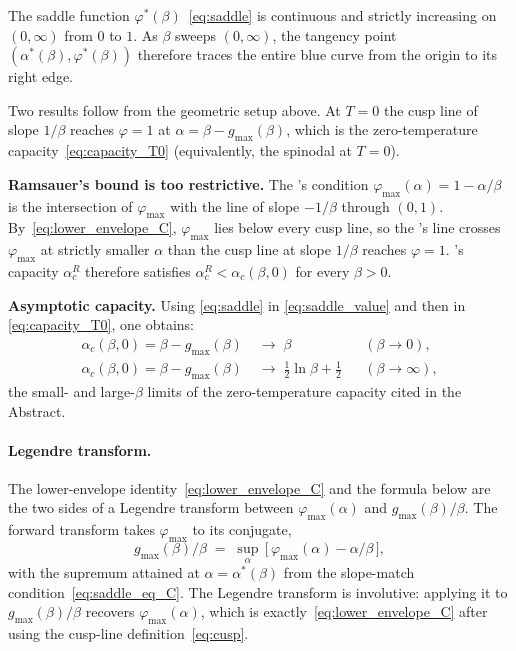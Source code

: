 \documentclass[letterpaper]{article} %
\newcommand{\Bnet}{\beta}
\newcommand{\ac}{\alpha_c}
\begin{document}
The saddle function $\varphi^*(\Bnet)$~\eqref{eq:saddle} is
continuous and strictly increasing on $(0, \infty)$ from $0$ to $1$. As $\Bnet$ sweeps $(0, \infty)$,
the tangency point $(\alpha^*(\Bnet), \varphi^*(\Bnet))$ therefore traces the
entire blue curve from the origin to its right edge.

Two results follow from the geometric setup above.  At $T = 0$ the
cusp line of slope $1/\Bnet$ reaches $\varphi = 1$ at
$\alpha = \Bnet - g_{\max}(\Bnet)$, which is the zero-temperature
capacity~\eqref{eq:capacity_T0} (equivalently, the spinodal at
$T = 0$).

\textbf{Ramsauer's bound is too restrictive.}  The \citeauthor{ramsauer2021hopfield}'s condition
$\varphi_{\max}(\alpha) = 1 - \alpha/\Bnet$ is the intersection of
$\varphi_{\max}$ with the line of slope $-1/\Bnet$ through $(0, 1)$.
By~\eqref{eq:lower_envelope_C}, $\varphi_{\max}$ lies below every
cusp line, so the \citeauthor{ramsauer2021hopfield}'s line crosses $\varphi_{\max}$ at strictly
smaller $\alpha$ than the cusp line at slope $1/\Bnet$ reaches
$\varphi = 1$.  \citeauthor{ramsauer2021hopfield}'s capacity $\alpha_c^R$ therefore satisfies
$\alpha_c^R < \alpha_c(\Bnet, 0)$ for every $\Bnet > 0$.

\textbf{Asymptotic capacity.}  Using \eqref{eq:saddle} in
\eqref{eq:saddle_value} and then in \eqref{eq:capacity_T0}, one obtains:
\begin{equation}
\begin{aligned}
\ac(\Bnet, 0) = \Bnet - g_{\max}(\Bnet) &\;\to\; \Bnet
   && (\Bnet \to 0),\\
\ac(\Bnet, 0) = \Bnet - g_{\max}(\Bnet) &\;\to\; \tfrac{1}{2}\ln\Bnet + \tfrac{1}{2}
   && (\Bnet \to \infty),
\end{aligned}
\label{eq:asymptotic_C}
\end{equation}
the small- and large-$\Bnet$ limits of the zero-temperature capacity
cited in the Abstract.

\paragraph{Legendre transform.}
The lower-envelope identity~\eqref{eq:lower_envelope_C} and the formula
below are the two sides of a Legendre transform between
$\varphi_{\max}(\alpha)$ and $g_{\max}(\Bnet)/\Bnet$.  The forward
transform takes $\varphi_{\max}$ to its conjugate,
\begin{equation}
g_{\max}(\Bnet)/\Bnet \;=\; \sup_\alpha\,\bigl[\,\varphi_{\max}(\alpha) - \alpha/\Bnet\,\bigr],
\label{eq:legendre_C}
\end{equation}
with the supremum attained at $\alpha = \alpha^*(\Bnet)$ from the
slope-match condition~\eqref{eq:saddle_eq_C}.  The Legendre transform
is involutive: applying it to $g_{\max}(\Bnet)/\Bnet$ recovers
$\varphi_{\max}(\alpha)$, which is exactly~\eqref{eq:lower_envelope_C}
after using the cusp-line definition~\eqref{eq:cusp}.
\end{document}
